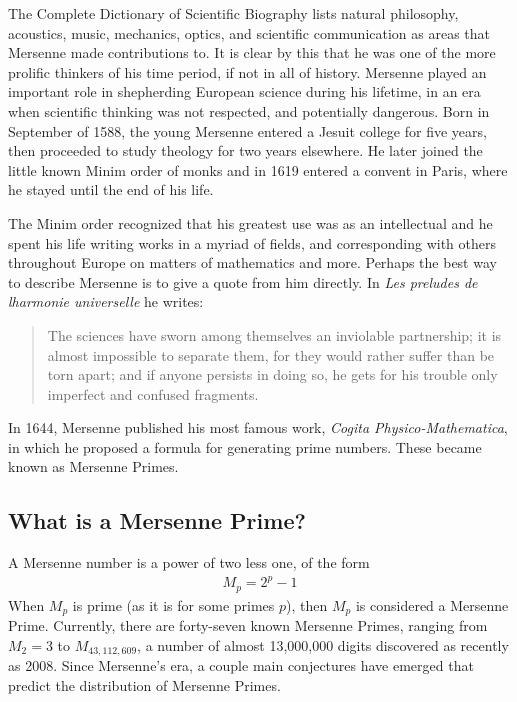 
The Complete Dictionary of Scientific Biography\cite{scibio} lists natural philosophy, acoustics, music, mechanics, optics, and scientific communication as areas that Mersenne made contributions to.  It is clear by this that he was one of the more prolific thinkers of his time period, if not in all of history. Mersenne played an important role in shepherding European science during his lifetime, in an era when scientific thinking was not respected, and potentially dangerous.  Born in September of 1588, the young Mersenne entered a Jesuit college for five years, then proceeded to study theology for two years elsewhere. He later joined the little known Minim order of monks and in 1619 entered a convent in Paris, where he stayed until the end of his life.  

The Minim order recognized that his greatest use was as an intellectual and he spent his life writing works in a myriad of fields, and corresponding with others throughout Europe on matters of mathematics and more. Perhaps the best way to describe Mersenne is to give a quote from him directly. In \emph{Les preludes de lharmonie universelle} he writes:

\begin{quote}
The sciences have sworn among themselves an inviolable partnership; it is almost impossible to separate them, for they would rather suffer than be torn apart; and if anyone persists in doing so, he gets for his trouble only imperfect and confused fragments. \cite{lfrench}
\end{quote}

In 1644, Mersenne published his most famous work, \emph{Cogita Physico-Mathematica}, in which he proposed a formula for generating prime numbers. These became known as Mersenne Primes.

\subsection{What is a Mersenne Prime?}

A Mersenne number is a power of two less one, of the form
\begin{align}
M_p = 2^p - 1
\label{eqn:mp}
\end{align}
When $M_p$ is prime (as it is for some primes $p$), then $M_p$ is considered a Mersenne Prime. Currently,
there are forty-seven known Mersenne Primes, ranging from $M_2 = 3$ to $M_{43,112,609}$, a number of almost
13,000,000 digits discovered as recently as 2008. Since Mersenne's era, a couple main conjectures have emerged
that predict the distribution of Mersenne Primes.

